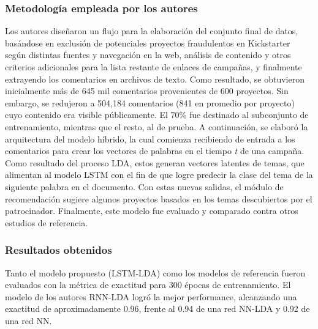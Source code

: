 \subsubsection{Metodología empleada por los autores}
Los autores diseñaron un flujo para la elaboración del conjunto final de datos, basándose en exclusión de potenciales proyectos fraudulentos en Kickstarter según distintas fuentes y navegación en la web, análisis de contenido y otros criterios adicionales para la lista restante de enlaces de campañas, y finalmente extrayendo los comentarios en archivos de texto. Como resultado, se obtuvieron inicialmente más de 645 mil comentarios provenientes de 600 proyectos. Sin embargo, se redujeron a 504,184 comentarios (841 en promedio por proyecto) cuyo contenido era visible públicamente. El 70\% fue destinado al subconjunto de entrenamiento, mientras que el resto, al de prueba. A continuación, se elaboró la arquitectura del modelo híbrido, la cual comienza recibiendo de entrada a los comentarios para crear los vectores de palabras en el tiempo \textit{t} de una campaña. Como resultado del proceso LDA, estos generan vectores latentes de temas, que alimentan al modelo LSTM con el fin de que logre predecir la clase del tema de la siguiente palabra en el documento. Con estas nuevas salidas, el módulo de recomendación sugiere algunos proyectos basados en los temas descubiertos por el patrocinador. Finalmente, este modelo fue evaluado y comparado contra otros estudios de referencia.

\subsubsection{Resultados obtenidos}
Tanto el modelo propuesto (LSTM-LDA) como los modelos de referencia fueron evaluados con la métrica de exactitud para 300 épocas de entrenamiento. El modelo de los autores RNN-LDA logró la mejor performance, alcanzando una exactitud de aproximadamente 0.96, frente al 0.94 de una red NN-LDA y 0.92 de una red NN.